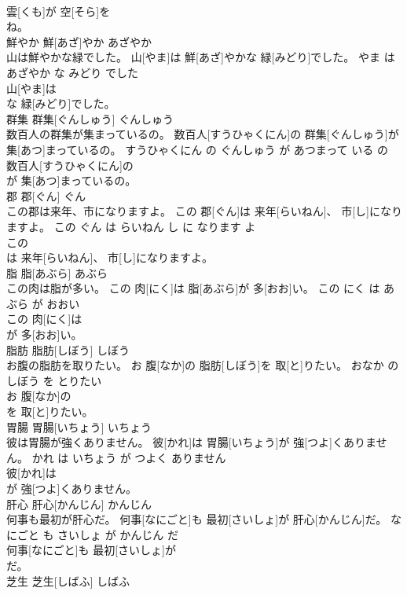 \documentclass[8pt]{extreport}
\begin{document}
\begin{CJK}{UTF8}{min}
\\	雲[くも]が 空[そら]を
\\	ね。			
\\	鮮やか	鮮[あざ]やか	あざやか	
\\	山は鮮やかな緑でした。	山[やま]は 鮮[あざ]やかな 緑[みどり]でした。	やま は あざやか な みどり でした	
\\	山[やま]は
\\	な 緑[みどり]でした。			
\\	群集	群集[ぐんしゅう]	ぐんしゅう	
\\	数百人の群集が集まっているの。	数百人[すうひゃくにん]の 群集[ぐんしゅう]が 集[あつ]まっているの。	すうひゃくにん の ぐんしゅう が あつまって いる の	
\\	数百人[すうひゃくにん]の
\\	が 集[あつ]まっているの。			
\\	郡	郡[ぐん]	ぐん	
\\	この郡は来年、市になりますよ。	この 郡[ぐん]は 来年[らいねん]、 市[し]になりますよ。	この ぐん は らいねん し に なります よ	
\\	この
\\	は 来年[らいねん]、 市[し]になりますよ。			
\\	脂	脂[あぶら]	あぶら	
\\	この肉は脂が多い。	この 肉[にく]は 脂[あぶら]が 多[おお]い。	この にく は あぶら が おおい	
\\	この 肉[にく]は
\\	が 多[おお]い。			
\\	脂肪	脂肪[しぼう]	しぼう	
\\	お腹の脂肪を取りたい。	お 腹[なか]の 脂肪[しぼう]を 取[と]りたい。	おなか の しぼう を とりたい	
\\	お 腹[なか]の
\\	を 取[と]りたい。			
\\	胃腸	胃腸[いちょう]	いちょう	
\\	彼は胃腸が強くありません。	彼[かれ]は 胃腸[いちょう]が 強[つよ]くありません。	かれ は いちょう が つよく ありません	
\\	彼[かれ]は
\\	が 強[つよ]くありません。			
\\	肝心	肝心[かんじん]	かんじん	
\\	何事も最初が肝心だ。	何事[なにごと]も 最初[さいしょ]が 肝心[かんじん]だ。	なにごと も さいしょ が かんじん だ	
\\	何事[なにごと]も 最初[さいしょ]が
\\	だ。			
\\	芝生	芝生[しばふ]	しばふ	

\end{CJK}
\end{document}
